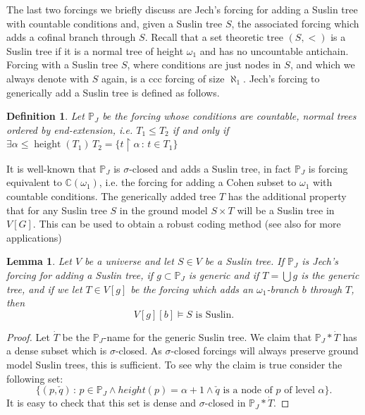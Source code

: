 \documentclass[a4paper,11pt]{article}
\newtheorem{lemma}[theorem]{Lemma}
\newtheorem{definition}[theorem]{Definition}
\newcommand{\forceP}{\mathbb{P}}
\begin{document}
The last two forcings we briefly discuss are Jech's forcing for adding a Suslin tree with countable conditions and, given a Suslin tree $S$, the associated forcing which adds a cofinal branch through $S$. 
Recall that a set theoretic tree $(S, <)$ is a Suslin tree if it is a normal tree of height $\omega_1$
and has no uncountable antichain. Forcing with a Suslin tree $S$, where conditions are just nodes in $S$, and which we always denote with $S$ again, is a ccc forcing of size $\aleph_1$. 
Jech's forcing to generically add a Suslin tree is defined as follows.

\begin{definition}
 Let $\forceP_J$ be the forcing whose conditions are
 countable, normal trees ordered by end-extension, i.e. $T_1 \le T_2$ if and only
 if $\exists \alpha \le \operatorname{height}(T_1) \, T_2= \{ t \upharpoonright \alpha \, : \, t \in T_1 \}$
\end{definition}
It is well-known that $\forceP_J$ is $\sigma$-closed and
adds a Suslin tree, in fact $\forceP_J$ is forcing equivalent to $\mathbb{C} (\omega_1)$, i.e. the forcing for adding a Cohen subset to $\omega_1$ with countable conditions. The generically added tree $T$ has 
the additional property that for any Suslin tree $S$ in the ground model
$S \times T$ will be a Suslin tree in $V[G]$. This can be used to obtain a robust coding method (see also \cite{Ho} for more applications)
\begin{lemma}\label{1 preservation of Suslin trees}
 Let $V$ be a universe and let $S \in V$ be a Suslin tree. If $\forceP_J$ is 
 Jech's forcing for adding a Suslin tree, if $g \subset \forceP_J$ is generic  and if $T=\bigcup g $ is the generic tree, and if we let $T\in V[g]$ be the forcing which adds an $\omega_1$-branch $b$ through $T$,
 then $$V[g][b] \models  S \text{ is Suslin.}$$
\end{lemma}

\begin{proof}
Let $\dot{T}$ be the $\forceP_J$-name for the generic Suslin tree. We claim that $\forceP_J \ast \dot{T}$ has a dense subset which is $\sigma$-closed. As $\sigma$-closed forcings will always preserve ground model Suslin trees, this is sufficient. To see why the claim is true consider the following set:
$$\{ (p, \check{q}) \, : \, p \in \forceP_J \land height(p)= \alpha+1  \land  \check{q} \text{ is a node of $p$ of level } \alpha \}.$$
It is easy to check that this set is dense and $\sigma$-closed in $\forceP_J \ast \dot{T}$.

\end{proof}
\end{document}
